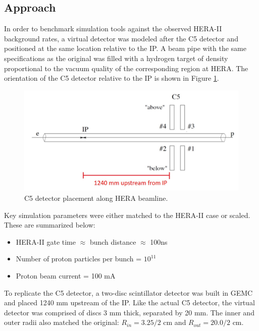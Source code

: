 \subsection{Approach}

In order to benchmark simulation tools against the observed HERA-II background rates, a virtual detector was modeled after the C5 detector and positioned at the same location relative to the IP.  A beam pipe with the same specifications as the original was filled with a hydrogen target of density proportional to the vacuum quality of the corresponding region at HERA.  The orientation of the C5 detector relative to the IP is shown in Figure \ref{fig:hera4}.  

\begin{figure}
	\centering
	\includegraphics[width=.75\textwidth]{../../img/c5_placement.jpg}
	\caption{C5 detector placement along HERA beamline.}
	\label{fig:hera4}
\end{figure}


Key simulation parameters were either matched to the HERA-II case or scaled.  These are summarized below:


\begin{itemize}
	\item HERA-II gate time $\approx$ bunch distance $\approx$ 100ns
	\item Number of proton particles per bunch = $10^{11}$
	\item Proton beam current = 100 mA
\end{itemize}

To replicate the C5 detector, a two-disc scintillator detector was built in GEMC and placed 1240 mm upstream of the IP.  Like the actual C5 detector, the virtual detector was comprised of discs 3 mm thick, separated by 20 mm.  The inner and outer radii also matched the original: $R_{in} = 3.25/2$ cm and $R_{out} = 20.0/2$ cm.  

